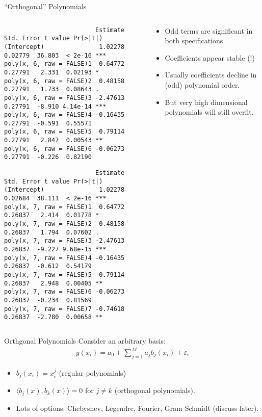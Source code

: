 \begin{frame}[fragile]{``Orthogonal'' Polynomials}
\begin{columns}
\begin{column}{0.6\textwidth}
\tiny
\begin{verbatim}
                         Estimate Std. Error t value Pr(>|t|)    
(Intercept)               1.02278    0.02779  36.803  < 2e-16 ***
poly(x, 6, raw = FALSE)1  0.64772    0.27791   2.331  0.02193 *  
poly(x, 6, raw = FALSE)2  0.48158    0.27791   1.733  0.08643 .  
poly(x, 6, raw = FALSE)3 -2.47613    0.27791  -8.910 4.14e-14 ***
poly(x, 6, raw = FALSE)4 -0.16435    0.27791  -0.591  0.55571    
poly(x, 6, raw = FALSE)5  0.79114    0.27791   2.847  0.00543 ** 
poly(x, 6, raw = FALSE)6 -0.06273    0.27791  -0.226  0.82190    
\end{verbatim}

\begin{verbatim}
                         Estimate Std. Error t value Pr(>|t|)    
(Intercept)               1.02278    0.02684  38.111  < 2e-16 ***
poly(x, 7, raw = FALSE)1  0.64772    0.26837   2.414  0.01778 *  
poly(x, 7, raw = FALSE)2  0.48158    0.26837   1.794  0.07602 .  
poly(x, 7, raw = FALSE)3 -2.47613    0.26837  -9.227 9.68e-15 ***
poly(x, 7, raw = FALSE)4 -0.16435    0.26837  -0.612  0.54179    
poly(x, 7, raw = FALSE)5  0.79114    0.26837   2.948  0.00405 ** 
poly(x, 7, raw = FALSE)6 -0.06273    0.26837  -0.234  0.81569    
poly(x, 7, raw = FALSE)7 -0.74618    0.26837  -2.780  0.00658 ** 
\end{verbatim}
\end{column}
\begin{column}{0.4\textwidth}
\begin{itemize}
\item Odd terms are significant in both specifications
\item Coefficients appear stable (!)
\item Usually coefficients decline in (odd) polynomial order.
\item But very high dimensional polynomials will still \alert{overfit}.
\end{itemize}
\end{column}
\end{columns}
\end{frame}

\begin{frame}{Orthgonal Polynomials}
Consider an arbitrary basis:
\begin{align*}
y(x_i) = a_0 + \sum_{j=1}^M a_j b_j(x_i) + \varepsilon_i
\end{align*}
\begin{itemize}
\item $ b_j(x_i) = x_i^j$ (regular polynomials)
\item $\langle b_j(x),b_k(x)  \rangle=0$ for $j \neq k$ (orthogonal polynomials).
\item Lots of options: Chebyshev, Legendre, Fourier, Gram Schmidt (discuss later).
\end{itemize}
\end{frame}

